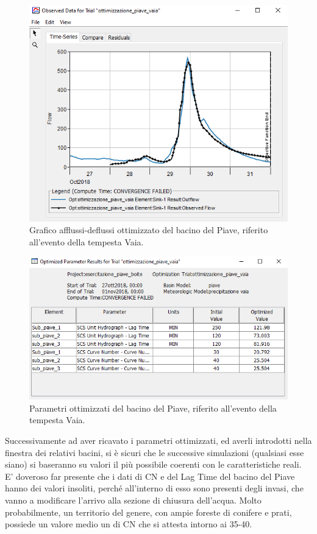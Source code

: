 \begin{figure}[H]\centering
    \includegraphics[scale=1]{immagini/ottim_piave.PNG}
    \caption{Grafico afflussi-deflussi ottimizzato del bacino del Piave, riferito all'evento della tempesta Vaia.}
        \label{ottim_piave}    
\end{figure}

\begin{figure}[H]\centering
    \includegraphics[scale=1]{immagini/par_ottimiz_piave.PNG}
    \caption{Parametri ottimizzati del bacino del Piave, riferito all'evento della tempesta Vaia.}
        \label{par_ottim_boite}    
    \end{figure}

Successivamente ad aver ricavato i parametri ottimizzati, ed averli introdotti nella finestra dei relativi bacini, si è sicuri che le successive simulazioni (qualsiasi esse siano) si baseranno su valori il più possibile coerenti con le caratteristiche reali.\\
E' doveroso far presente che i dati di CN e del Lag Time del bacino del Piave hanno dei valori insoliti, perché all'interno di esso sono presenti degli invasi, che vanno a modificare l'arrivo alla sezione di chiusura dell'acqua. Molto probabilmente, un territorio del genere, con ampie foreste di conifere e prati, possiede un valore medio un di CN che si attesta intorno ai 35-40.

